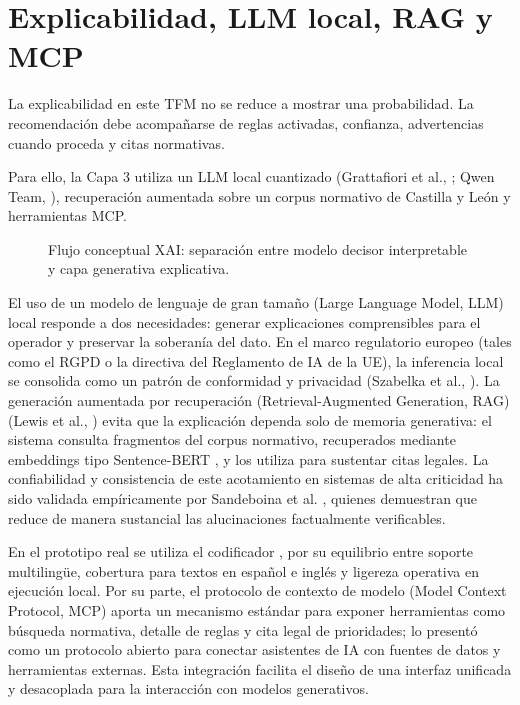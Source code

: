\section{Explicabilidad, LLM local, RAG y MCP}

La explicabilidad en este TFM no se reduce a mostrar una probabilidad. La recomendación debe acompañarse de reglas activadas, confianza, advertencias cuando proceda y citas normativas. 

Para ello, la Capa 3 utiliza un LLM local cuantizado (Grattafiori et al., ; Qwen Team, ), recuperación aumentada sobre un corpus normativo de Castilla y León y herramientas MCP.

\begin{figure}[htbp]
\centering
{}
\caption{Flujo conceptual XAI: separación entre modelo decisor interpretable y capa generativa explicativa.}
\label{fig:flujo-xai-rulefit-rag}
\end{figure}

El uso de un modelo de lenguaje de gran tamaño (Large Language Model, LLM) local responde a dos necesidades: generar explicaciones comprensibles para el operador y preservar la soberanía del dato. En el marco regulatorio europeo (tales como el RGPD o la directiva del Reglamento de IA de la UE), la inferencia local se consolida como un patrón de conformidad y privacidad (Szabelka et al., ). La generación aumentada por recuperación (Retrieval-Augmented Generation, RAG) (Lewis et al., ) evita que la explicación dependa solo de memoria generativa: el sistema consulta fragmentos del corpus normativo, recuperados mediante embeddings tipo Sentence-BERT \cite{Reimers2019SBERT}, y los utiliza para sustentar citas legales. La confiabilidad y consistencia de este acotamiento en sistemas de alta criticidad ha sido validada empíricamente por Sandeboina et al. \citeyear{Sandeboina2026RAGReliability}, quienes demuestran que reduce de manera sustancial las alucinaciones factualmente verificables.

En el prototipo real se utiliza el codificador , por su equilibrio entre soporte multilingüe, cobertura para textos en español e inglés y ligereza operativa en ejecución local. Por su parte, el protocolo de contexto de modelo (Model Context Protocol, MCP) aporta un mecanismo estándar para exponer herramientas como búsqueda normativa, detalle de reglas y cita legal de prioridades;  lo presentó como un protocolo abierto para conectar asistentes de IA con fuentes de datos y herramientas externas. Esta integración facilita el diseño de una interfaz unificada y desacoplada para la interacción con modelos generativos.


